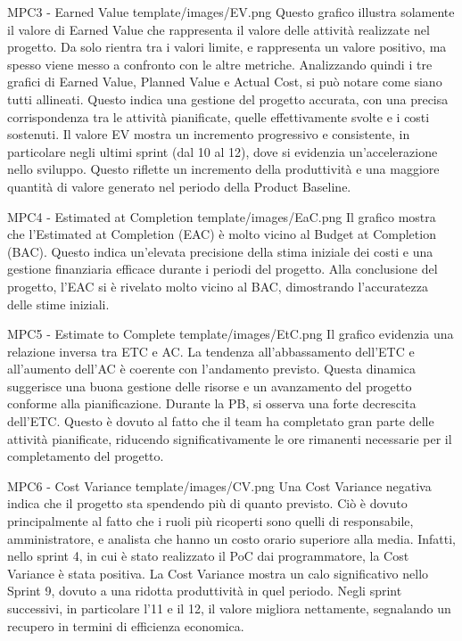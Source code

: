 \Met
{ %
    MPC3 - Earned Value
}
{ %
    template/images/EV.png
}
{ %
    Questo grafico illustra solamente il valore di Earned Value che rappresenta il valore delle attività realizzate nel progetto.
    Da solo rientra tra i valori limite, e rappresenta un valore positivo, ma spesso viene messo a confronto con le altre metriche.
    Analizzando quindi i tre grafici di Earned Value, Planned Value e Actual Cost, si può notare come siano tutti allineati. 
    Questo indica una gestione del progetto accurata, con una precisa corrispondenza tra le attività pianificate, quelle effettivamente svolte e i costi sostenuti.
}
{ %
    Il valore EV mostra un incremento progressivo e consistente, in particolare negli ultimi sprint (dal 10 al 12), dove si evidenzia un'accelerazione nello sviluppo. Questo riflette un incremento della produttività e una maggiore quantità di valore generato nel periodo della Product Baseline.
}

\Met
{ %
    MPC4 - Estimated at Completion
}
{ %
    template/images/EaC.png
}
{ %
    Il grafico mostra che l'Estimated at Completion (EAC) è molto vicino al Budget at Completion (BAC).
    Questo indica un'elevata precisione della stima iniziale dei costi e una gestione finanziaria efficace durante i periodi del progetto. 
}
{ %
    Alla conclusione del progetto, l’EAC si è rivelato molto vicino al BAC, dimostrando l’accuratezza delle stime iniziali.
}


\Met
{ %
    MPC5 - Estimate to Complete
}
{ %
    template/images/EtC.png
}
{ %
    Il grafico evidenzia una relazione inversa tra ETC e AC.
    La tendenza all'abbassamento dell'ETC e all'aumento dell'AC è coerente con l'andamento previsto. 
    Questa dinamica suggerisce una buona gestione delle risorse e un avanzamento del progetto conforme alla pianificazione.
}
{ %
    Durante la PB, si osserva una forte decrescita dell'ETC. Questo è dovuto al fatto che il team ha completato gran parte delle attività pianificate, riducendo significativamente le ore rimanenti necessarie per il completamento del progetto.
}


\Met
{ %
    MPC6 - Cost Variance
}
{ %
    template/images/CV.png
}
{ %
    Una Cost Variance negativa indica che il progetto sta spendendo più di quanto previsto. 
    Ciò è dovuto principalmente al fatto che i ruoli più ricoperti sono quelli di responsabile, 
    amministratore, e analista che hanno un costo orario superiore alla media.
    Infatti, nello sprint 4, in cui è stato realizzato il PoC dai programmatore, la Cost Variance è stata positiva.
}
{ %
    La Cost Variance mostra un calo significativo nello Sprint 9, dovuto a una ridotta produttività in quel periodo. Negli sprint successivi, in particolare l'11 e il 12, il valore migliora nettamente, segnalando un recupero in termini di efficienza economica.
}

